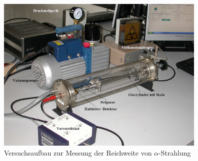 \begin{figure}[h]
  \centering
  \label{fig:Versuchsaufbau}
  \includegraphics[width=0.9\textwidth]{Grafiken/V701_Versuchsaufbau.jpg}
  \caption{Versuchsaufbau zur Messung der Reichweite von $\alpha$-Strahlung}
\end{figure}
